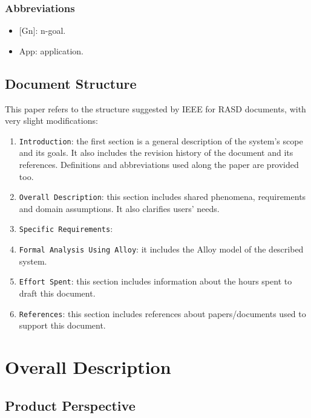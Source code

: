 \documentclass[12pt,a4paper]{article}
\begin{document}
			\subsubsection{Abbreviations}
				\begin{itemize}
				\item {[}Gn{]}: n-goal.
				\item {App}: application.
				\end{itemize}
		
		\subsection{Document Structure}
			This paper refers to the structure suggested by IEEE for RASD documents, with very slight modifications:
			\begin{enumerate}
				\item \texttt{Introduction}: the first section is a general description of the system's scope and its goals. It also includes the revision history of the document and its references. Definitions and abbreviations used along the paper are provided too.
				\item \texttt{Overall Description}: this section includes shared phenomena, requirements and domain assumptions. It also clarifies users' needs.
				\item \texttt{Specific Requirements}: 
				\item \texttt{Formal Analysis Using Alloy}: it includes the Alloy model of the described system.
				\item \texttt{Effort Spent}: this section includes information about the hours spent to draft this document. 
				\item \texttt{References}: this section includes references about papers/documents used to support this document.
			\end{enumerate}
		

	\newpage
	\section{Overall Description}
	
		\subsection{Product Perspective}
		
\end{document}
